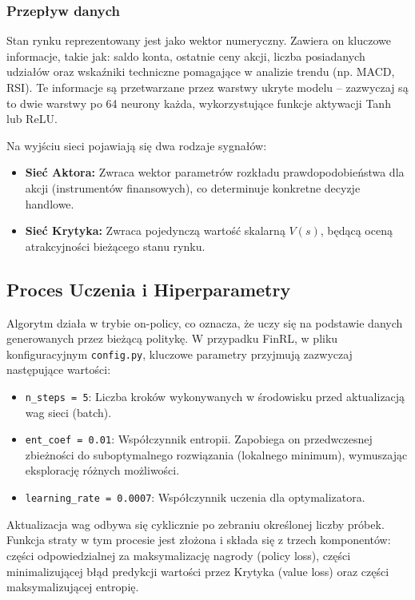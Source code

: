 \subsubsection{Przepływ danych}

Stan rynku reprezentowany jest jako wektor numeryczny. Zawiera on kluczowe informacje, takie jak: saldo konta, ostatnie ceny akcji, liczba posiadanych udziałów oraz wskaźniki techniczne pomagające w analizie trendu (np. MACD, RSI). Te informacje są przetwarzane przez warstwy ukryte modelu – zazwyczaj są to dwie warstwy po 64 neurony każda, wykorzystujące funkcje aktywacji Tanh lub ReLU.

Na wyjściu sieci pojawiają się dwa rodzaje sygnałów:
\begin{itemize}
    \item \textbf{Sieć Aktora:} Zwraca wektor parametrów rozkładu prawdopodobieństwa dla akcji (instrumentów finansowych), co determinuje konkretne decyzje handlowe.
    \item \textbf{Sieć Krytyka:} Zwraca pojedynczą wartość skalarną $V(s)$, będącą oceną atrakcyjności bieżącego stanu rynku.
\end{itemize}

\subsection{Proces Uczenia i Hiperparametry}

Algorytm działa w trybie on-policy, co oznacza, że uczy się na podstawie danych generowanych przez bieżącą politykę. W przypadku FinRL, w pliku konfiguracyjnym \texttt{config.py}, kluczowe parametry przyjmują zazwyczaj następujące wartości:

\begin{itemize}
    \item \texttt{n\_steps = 5}: Liczba kroków wykonywanych w środowisku przed aktualizacją wag sieci (batch).
    \item \texttt{ent\_coef = 0.01}: Współczynnik entropii. Zapobiega on przedwczesnej zbieżności do suboptymalnego rozwiązania (lokalnego minimum), wymuszając eksplorację różnych możliwości.
    \item \texttt{learning\_rate = 0.0007}: Współczynnik uczenia dla optymalizatora.
\end{itemize}

Aktualizacja wag odbywa się cyklicznie po zebraniu określonej liczby próbek. Funkcja straty w tym procesie jest złożona i składa się z trzech komponentów: części odpowiedzialnej za maksymalizację nagrody (policy loss), części minimalizującej błąd predykcji wartości przez Krytyka (value loss) oraz części maksymalizującej entropię.

